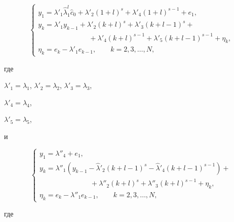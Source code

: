 \begin{equation}    \label{f2_2_121}

\left\{\begin{array}{l}

y_1=\lambda'_1 \hat{\lambda}_1 ^{l} \hat{c}_0 + \lambda'_2 (1+l)^s+ \lambda'_4 (1+l)^{s-1} +e_1,\\

y_k=\lambda'_1{y_{k-1}}+\lambda'_2 (k+l)^s +\lambda'_3(k+l-1)^s +\\

\hspace{3cm} 

+\lambda'_4 (k+l)^{s-1} +\lambda'_5(k+l-1)^{s-1} +\eta_k ,\\

\eta_k=e_k-\lambda'_1{e_{k-1}} ,\qquad  k=2, 3, \dots, N,

\end{array}\right.

\end{equation}

где

$\lambda'_1= \lambda_1$, $\lambda'_2= \lambda_2$, $\lambda'_3= \lambda_3$,

$\lambda'_4= \lambda_4$,

$\lambda'_5= \lambda_5$,


и

\begin{equation}    \label{f2_2_122}

\left\{\begin{array}{l}

y_1=\lambda''_4 +e_1,\\

y_k=\lambda''_1({y_{k-1}} -\hat{ \lambda}'_2(k+l-1)^s  -\hat{ \lambda}'_4(k+l-1)^{s-1})+\\

\hspace{3cm}

+\lambda''_2 (k+l)^s +\lambda''_3 (k+l)^{s-1}+\eta_k ,\\

\eta_k=e_k-\lambda''_1{e_{k-1}} ,\qquad  k=2, 3, \dots, N,

\end{array}\right.

\end{equation}

где

